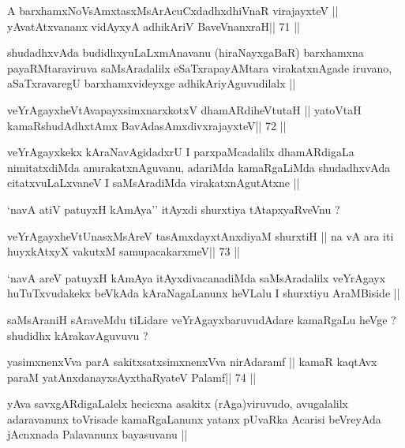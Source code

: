 \begin{shl}
A barxhamxNoV\s sAmxtasxMsArAcuCxdadhxdhiVnaR virajayxteV ||
yAvatAtxvananx vidAyxyA adhikAriV BaveVnanxraH\hfill || 71 ||
\end{shl}

\begin{artha}
shudadhxvAda budidhxyuLaLxmAnavanu (hiraNayxgaBaR) barxhamxna
payaRMtaraviruva saMsAradalilx eSaTxrapayAMtara virakatxnAgade
iruvano, aSaTxravaregU barxhamxvideyxge adhikAriyAguvudilalx ||
\end{artha}

\begin{shl}
veYrAgayxheVtAvapayxsimxnarxkotxV dhamARdiheVtutaH ||
yatoV\s taH kamaRshudAdhxtAmx BavAdasAmxdivxrajayxteV\hfill || 72 ||
\end{shl}

\begin{artha}
veYrAgayxkekx kAraNavAgidadxrU I parxpaMcadalilx dhamARdigaLa
nimitatxdiMda anurakatxnAguvanu, adariMda kamaRgaLiMda shudadhxvAda
citatxvuLaLxvaneV I saMsAradiMda virakatxnAgutAtxne ||

`navA atiV patuyxH kAmAya'' itAyxdi shurxtiya tAtapxyaRveVnu ?
\end{artha}

\begin{shl}
veYrAgayxheVtUnasxMsAreV tasAmxdayxtAnxdiyaM shurxtiH ||
na vA ara iti huyxkAtxyX vakutxM samupacakarxmeV\hfill || 73 ||
\end{shl}

\begin{artha}
`navA areV patuyxH kAmAya itAyxdivacanadiMda saMsAradalilx veYrAgayx
  huTuTxvudakekx beVkAda kAraNagaLanunx heVLalu I shurxtiyu AraMBiside ||
\end{artha}

\begin{artha}
saMsAraniH sAraveMdu tiLidare veYrAgayxbaruvudAdare kamaRgaLu heVge ?
shudidhx kArakavAguvuvu ?
\end{artha}

\begin{shl}
yasimxnenxVva parA sakitxsatxsimxnenxVva nirAdaramf ||
kamaR kaqtAvx paraM yatAnxdanayxsAyxthaRyateV Palamf\hfill || 74 ||
\end{shl}

\begin{artha}
yAva savxgARdigaLalelx hecicxna asakitx (rAga)viruvudo, avugalalilx
adaravanunx toVrisade kamaRgaLanunx yatanx pUvaRka Acarisi beVreyAda
jAcnxnada Palavanunx bayasuvanu ||
\end{artha}

